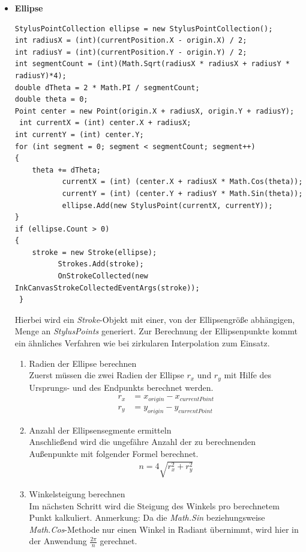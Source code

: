 \begin{itemize}
\item \textbf{Ellipse}\\ 
\begin{lstlisting}[language = CSharp, captionpos=b, caption={Ellipse in Strokes konvertieren}]
StylusPointCollection ellipse = new StylusPointCollection();
int radiusX = (int)(currentPosition.X - origin.X) / 2;
int radiusY = (int)(currentPosition.Y - origin.Y) / 2;
int segmentCount = (int)(Math.Sqrt(radiusX * radiusX + radiusY * radiusY)*4);
double dTheta = 2 * Math.PI / segmentCount;
double theta = 0;
Point center = new Point(origin.X + radiusX, origin.Y + radiusY);                        
 int currentX = (int) center.X + radiusX;
int currentY = (int) center.Y;
for (int segment = 0; segment < segmentCount; segment++)
{
	theta += dTheta;
           currentX = (int) (center.X + radiusX * Math.Cos(theta));
           currentY = (int) (center.Y + radiusY * Math.Sin(theta));
           ellipse.Add(new StylusPoint(currentX, currentY));
}
if (ellipse.Count > 0)
{
	stroke = new Stroke(ellipse);
          Strokes.Add(stroke);
          OnStrokeCollected(new InkCanvasStrokeCollectedEventArgs(stroke));
 }
\end{lstlisting}
Hierbei wird ein \textit{Stroke}-Objekt mit einer, von der Ellipsengröße abhängigen, Menge an \textit{StylusPoints} generiert. Zur Berechnung der Ellipsenpunkte kommt ein ähnliches Verfahren wie bei zirkularen Interpolation zum Einsatz.
\begin{enumerate}
\item Radien der Ellipse berechnen\\
Zuerst müssen die zwei Radien der Ellipse $r_x$ und $r_y$ mit Hilfe des Ursprungs- und des Endpunkts berechnet werden.
\begin{align}
r_x &= x_{origin} - x_{currentPoint}\\
r_y &= y_{origin} - y_{currentPoint}
\end{align}
\item Anzahl der Ellipsensegmente ermitteln\\
Anschließend wird die ungefähre Anzahl der zu berechnenden Außenpunkte mit folgender Formel berechnet.
\begin{align}
n = 4 \sqrt{r_x^2+r_y^2}
\end{align}
\item Winkelsteigung berechnen\\
Im nächsten Schritt wird die Steigung des Winkels pro berechnetem Punkt kalkuliert.
Anmerkung: Da die \textit{Math.Sin} beziehungsweise \textit{Math.Cos}-Methode nur einen Winkel in Radiant übernimmt, wird hier in der Anwendung $\frac{2\pi}{n}$ gerechnet.

\end{enumerate}
\end{itemize}
